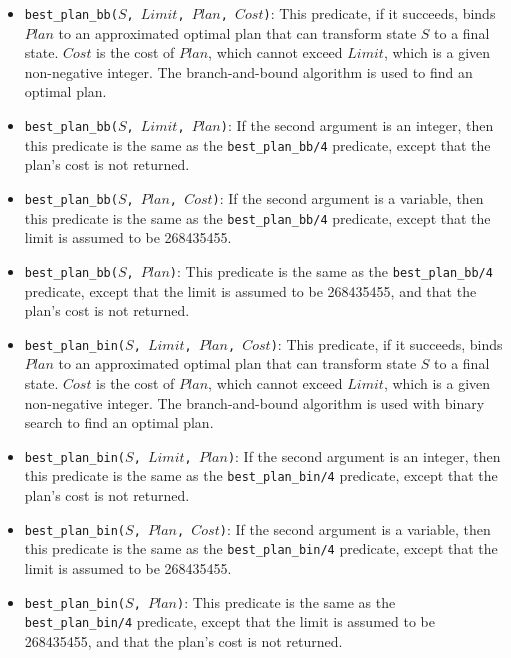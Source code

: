 \begin{itemize}
\item \texttt{best\_plan\_bb($S$, $Limit$, $Plan$, $Cost$)}: 
This predicate, if it succeeds, binds $Plan$ to an approximated optimal plan that can transform state $S$ to a final state. $Cost$ is the cost of $Plan$, which cannot exceed $Limit$, which is a given non-negative integer. The branch-and-bound algorithm is used to find an optimal plan.

\item \texttt{best\_plan\_bb($S$, $Limit$, $Plan$)}: If the second argument is an integer, then this predicate is the same as the \texttt{best\_plan\_bb/4} predicate, except that the plan's cost is not returned. 

\item \texttt{best\_plan\_bb($S$, $Plan$, $Cost$)}: If the second argument is a variable, then this predicate is the same as the \texttt{best\_plan\_bb/4} predicate, except that the limit is assumed to be 268435455.

\item \texttt{best\_plan\_bb($S$, $Plan$)}: 
This predicate is the same as the \texttt{best\_plan\_bb/4} predicate, except that the limit is assumed to be 268435455, and that the plan's cost is not returned.

\item \texttt{best\_plan\_bin($S$, $Limit$, $Plan$, $Cost$)}: 
This predicate, if it succeeds, binds \newline $Plan$ to an approximated optimal plan that can transform state $S$ to a final state. $Cost$ is the cost of $Plan$, which cannot exceed $Limit$, which is a given non-negative integer. The branch-and-bound algorithm is used with binary search to find an optimal plan.

\item \texttt{best\_plan\_bin($S$, $Limit$, $Plan$)}: If the second argument is an integer, then this predicate is the same as the \texttt{best\_plan\_bin/4} predicate, except that the plan's cost is not returned. 

\item \texttt{best\_plan\_bin($S$, $Plan$, $Cost$)}: If the second argument is a variable, then this predicate is the same as the \texttt{best\_plan\_bin/4} predicate, except that the limit is assumed to be 268435455.

\item \texttt{best\_plan\_bin($S$, $Plan$)}: 
This predicate is the same as the \texttt{best\_plan\_bin/4} predicate, except that the limit is assumed to be 268435455, and that the plan's cost is not returned.


\end{itemize}
